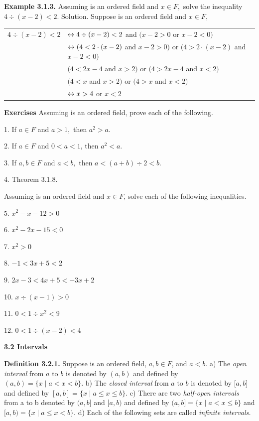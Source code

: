 \begin{large}
\textbf{Example 3.1.3.} Assuming \of is an ordered field and $x\in F,$ solve the inequality $4\div(x-2) < 2.$\nl
 Solution. Suppose \of is an ordered field and $x\in F,$

\newpage
\begin{tabular}{l l}
$4\div(x-2) < 2$&$\leftrightarrow 4\div (x-2) < 2$ and $(x-2>0$ or $x-2<0)$\\
&$\leftrightarrow (4 < 2\cdot (x-2)$ and $x - 2 >0)$ or $(4>2\cdot (x-2)$ and $x - 2 < 0)$\\
&$(4 < 2x - 4$ and $x > 2)$ or $(4 > 2x - 4$ and $ x < 2)$\\
&$(4 < x$ and $x > 2)$ or $(4 > x$ and $x < 2)$ \\
&$\leftrightarrow x > 4$ or $x < 2$\\
\end{tabular}\nl

\textbf{Exercises}\nl
 Assuming \of is an ordered field, prove each of the following. \nl

1. If $a\in F$ and $a > 1,$ then $a^{2} > a.$ \nl

2. If $a\in F$ and $0 < a < 1$, then $a^{2} < a.$\nl

3. If $a,b\in F$ and $a < b,$ then $a < (a+b)\div 2 < b.$ \nl

4. Theorem 3.1.8. \nl

Assuming \of  is an ordered field and $x\in F$, solve each of the following inequalities.

5. $x^{2} -x - 12 > 0$\nl

6. $x^{2} - 2x - 15 < 0$\nl

7. $x^{2} > 0$\nl

8. $-1 < 3x + 5 < 2 $\nl

9. $2x - 3 < 4x + 5 <-3x + 2$\nl

10. $x\div(x-1) > 0 $\nl

11. $0 < 1\div  x^{2} < 9 $\nl

12. $0 < 1\div(x-2) < 4$ \nl

\textbf{3.2 Intervals }\nl

\textbf{Definition 3.2.1.} Suppose \of is an ordered field, $a,b\in F$, and $a < b.$\nl
 a) The \textit{open interval} from $a$ to $b$ is denoted by $(a,b)$ and defined by
$(a,b)=\{ x \mid a < x < b \}.$\nl
 b) The \textit{closed interval} from $a$ to $b$ is denoted by [$a,b$] and defined by
$[a,b] =\{x \mid a \leq x \leq b \}.$ \nl
c) There are two \textit{half-open intervals} from a to b denoted by $(a,b]$ and $[a,b)$ and defined by $(a,b] = \{x \mid a < x \leq b\}$ and $[a,b) = \{x \mid a \leq x < b\}.$\nl
d) Each of the following sets are called \textit{infinite intervals.} \nl


\end{large}
